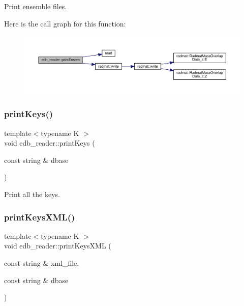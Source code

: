 Print ensemble files. 

Here is the call graph for this function\+:
\nopagebreak
\begin{figure}[H]
\begin{center}
\leavevmode
\includegraphics[width=350pt]{d8/d4f/namespaceedb__reader_ae02dd53c91dd84ab984521559b49306f_cgraph}
\end{center}
\end{figure}
\mbox{\label{namespaceedb__reader_af770eded7bd6582e1e379f54c13bd0c2}} 
\subsubsection{\texorpdfstring{printKeys()}{printKeys()}}
{\footnotesize\ttfamily template$<$typename K $>$ \\
void edb\+\_\+reader\+::print\+Keys (\begin{DoxyParamCaption}\item[{const string \&}]{dbase }\end{DoxyParamCaption})}



Print all the keys. 

\mbox{\label{namespaceedb__reader_add7c23b7ba3986c35bcaa28611526f89}} 
\subsubsection{\texorpdfstring{printKeysXML()}{printKeysXML()}}
{\footnotesize\ttfamily template$<$typename K $>$ \\
void edb\+\_\+reader\+::print\+Keys\+X\+ML (\begin{DoxyParamCaption}\item[{const string \&}]{xml\+\_\+file,  }\item[{const string \&}]{dbase }\end{DoxyParamCaption})}



